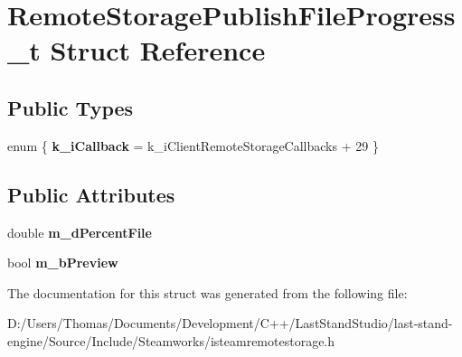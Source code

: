 \hypertarget{structRemoteStoragePublishFileProgress__t}{}\section{Remote\+Storage\+Publish\+File\+Progress\+\_\+t Struct Reference}
\label{structRemoteStoragePublishFileProgress__t}
\subsection*{Public Types}
\begin{DoxyCompactItemize}
\item 
\hypertarget{structRemoteStoragePublishFileProgress__t_a0d227b0b7e40d70cf9c10d3b9f391d32}{}enum \{ {\bfseries k\+\_\+i\+Callback} = k\+\_\+i\+Client\+Remote\+Storage\+Callbacks + 29
 \}\label{structRemoteStoragePublishFileProgress__t_a0d227b0b7e40d70cf9c10d3b9f391d32}

\end{DoxyCompactItemize}
\subsection*{Public Attributes}
\begin{DoxyCompactItemize}
\item 
\hypertarget{structRemoteStoragePublishFileProgress__t_ae5455cab84817b59caf010535f7b1cb5}{}double {\bfseries m\+\_\+d\+Percent\+File}\label{structRemoteStoragePublishFileProgress__t_ae5455cab84817b59caf010535f7b1cb5}

\item 
\hypertarget{structRemoteStoragePublishFileProgress__t_a9544e05f7b92c51fa0e6efa84dccec6d}{}bool {\bfseries m\+\_\+b\+Preview}\label{structRemoteStoragePublishFileProgress__t_a9544e05f7b92c51fa0e6efa84dccec6d}

\end{DoxyCompactItemize}


The documentation for this struct was generated from the following file\+:\begin{DoxyCompactItemize}
\item 
D\+:/\+Users/\+Thomas/\+Documents/\+Development/\+C++/\+Last\+Stand\+Studio/last-\/stand-\/engine/\+Source/\+Include/\+Steamworks/isteamremotestorage.\+h\end{DoxyCompactItemize}
